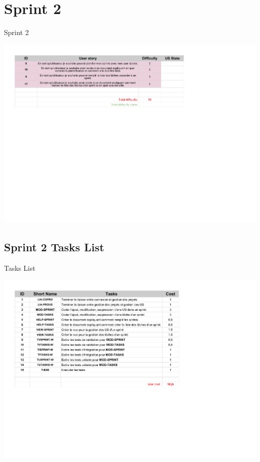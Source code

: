 \documentclass{beamer}
\begin{document}
\section{Sprint 2}

\begin{frame}{Sprint 2}
	\begin{center}
        \includegraphics[scale=0.55]{Sprint2.pdf}
        \end{center}
\end{frame}

\subsection{Sprint 2 Tasks List}

\begin{frame}{Tasks List}
	\begin{center}
        \includegraphics[scale=0.52]{Sprint2TasksList.pdf}
        \end{center}
\end{frame}
\end{document}
